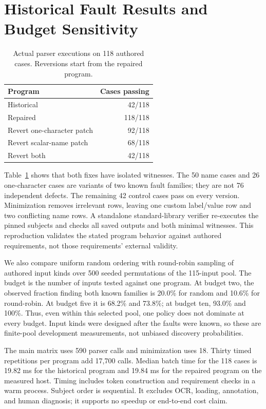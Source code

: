 \documentclass[sigconf,review,anonymous]{acmart}
\begin{document}
\section{Historical Fault Results and Budget Sensitivity}
\begin{table}[t]
\centering
\caption{Actual parser executions on 118 authored cases. Reversions start from the repaired program.}
\label{tab:parser}
\begin{tabular}{@{}lr@{}}
\toprule
Program & Cases passing\\
\midrule
Historical & 42/118\\
Repaired & 118/118\\
Revert one-character patch & 92/118\\
Revert scalar-name patch & 68/118\\
Revert both & 42/118\\
\bottomrule
\end{tabular}
\end{table}
Table~\ref{tab:parser} shows that both fixes have isolated witnesses. The 50 name cases and 26 one-character cases are variants of two known fault families; they are not 76 independent defects. The remaining 42 control cases pass on every version. Minimization removes irrelevant rows, leaving one custom label/value row and two conflicting name rows. A standalone standard-library verifier re-executes the pinned subjects and checks all saved outputs and both minimal witnesses. This reproduction validates the stated program behavior against authored requirements, not those requirements' external validity.

We also compare uniform random ordering with round-robin sampling of authored input kinds over 500 seeded permutations of the 115-input pool. The budget is the number of inputs tested against one program. At budget two, the observed fraction finding both known families is 20.0\% for random and 10.6\% for round-robin. At budget five it is 68.2\% and 73.8\%; at budget ten, 93.0\% and 100\%. Thus, even within this selected pool, one policy does not dominate at every budget. Input kinds were designed after the faults were known, so these are finite-pool development measurements, not unbiased discovery probabilities.

The main matrix uses 590 parser calls and minimization uses 18. Thirty timed repetitions per program add 17,700 calls. Median batch time for the 118 cases is 19.82 ms for the historical program and 19.84 ms for the repaired program on the measured host. Timing includes token construction and requirement checks in a warm process. Subject order is sequential. It excludes OCR, loading, annotation, and human diagnosis; it supports no speedup or end-to-end cost claim.
\end{document}
